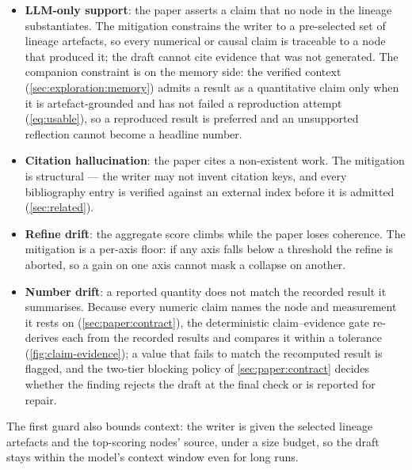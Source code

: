 \begin{itemize}
  \item \textbf{LLM-only support}: the paper asserts a claim that no
        node in the lineage substantiates. The mitigation constrains
        the writer to a pre-selected set of lineage artefacts, so every
        numerical or causal claim is traceable to a node that produced
        it; the draft cannot cite evidence that was not generated. The
        companion constraint is on the memory side: the verified context
        (\cref{sec:exploration:memory}) admits a result as a quantitative
        claim only when it is artefact-grounded and has not failed a
        reproduction attempt (\cref{eq:usable}), so a reproduced result is
        preferred and an unsupported reflection cannot become a headline
        number.
  \item \textbf{Citation hallucination}: the paper cites a non-existent
        work. The mitigation is structural --- the writer may not invent
        citation keys, and every bibliography entry is verified against
        an external index before it is admitted (\cref{sec:related}).
  \item \textbf{Refine drift}: the aggregate score climbs while the
        paper loses coherence. The mitigation is a per-axis floor: if
        any axis falls below a threshold the refine is aborted, so a
        gain on one axis cannot mask a collapse on another.
  \item \textbf{Number drift}: a reported quantity does not match the
        recorded result it summarises. Because every numeric claim
        names the node and measurement it rests on
        (\cref{sec:paper:contract}), the deterministic claim--evidence
        gate re-derives each from the recorded results and compares it
        within a tolerance (\cref{fig:claim-evidence}); a value that
        fails to match the recomputed result is flagged, and the
        two-tier blocking policy of \cref{sec:paper:contract} decides
        whether the finding rejects the draft at the final check or is
        reported for repair.
\end{itemize}

The first guard also bounds context: the writer is given the selected
lineage artefacts and the top-scoring nodes' source, under a size
budget, so the draft stays within the model's context window even for
long runs.
